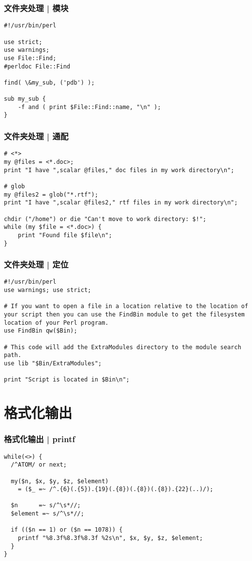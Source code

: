 \begin{frame}[fragile]
  \frametitle{文件夹处理 | 模块}
  \vspace{-1.5em}
\begin{lstlisting}
#!/usr/bin/perl

use strict;
use warnings;
use File::Find;
#perldoc File::Find

find( \&my_sub, ('pdb') );

sub my_sub {
    -f and ( print $File::Find::name, "\n" );
}
\end{lstlisting}
\end{frame}

\begin{frame}[fragile]
  \frametitle{文件夹处理 | 通配}
  \vspace{-1.5em}
\begin{lstlisting}
# <*>
my @files = <*.doc>;
print "I have ",scalar @files," doc files in my work directory\n";

# glob
my @files2 = glob("*.rtf");
print "I have ",scalar @files2," rtf files in my work directory\n";

chdir ("/home") or die "Can't move to work directory: $!";
while (my $file = <*.doc>) {
    print "Found file $file\n";
}
\end{lstlisting}
\end{frame}

\begin{frame}[fragile]
  \frametitle{文件夹处理 | 定位}
  \vspace{-1.5em}
\begin{lstlisting}
#!/usr/bin/perl
use warnings; use strict;

# If you want to open a file in a location relative to the location of your script then you can use the FindBin module to get the filesystem location of your Perl program.
use FindBin qw($Bin);

# This code will add the ExtraModules directory to the module search path.
use lib "$Bin/ExtraModules";

print "Script is located in $Bin\n";
\end{lstlisting}
\end{frame}

\section{格式化输出}
\begin{frame}[fragile]
  \frametitle{格式化输出 | printf}
  \vspace{-1.5em}
\begin{lstlisting}
while(<>) {
  /^ATOM/ or next;

  my($n, $x, $y, $z, $element)
    = ($_ =~ /^.{6}(.{5}).{19}(.{8})(.{8})(.{8}).{22}(..)/);

  $n      =~ s/^\s*//;
  $element =~ s/^\s*//;

  if (($n == 1) or ($n == 1078)) {
    printf "%8.3f%8.3f%8.3f %2s\n", $x, $y, $z, $element;
  }
}
\end{lstlisting}
\end{frame}

